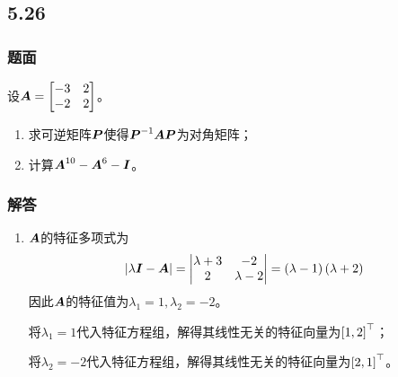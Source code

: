\documentclass{beamer}
\begin{document}
\subsection*{5.26}
\begin{frame}
    \frametitle{题面}
    设\(\boldsymbol{A}=\begin{bmatrix}-3&2\\-2&2\end{bmatrix}\)。
    \begin{enumerate}
        \item 求可逆矩阵\(\boldsymbol{P}\)使得\({\boldsymbol{P}}^{-1}\boldsymbol{A}\boldsymbol{P}\)为对角矩阵；
        \item 计算\(\boldsymbol{A}^{10}-\boldsymbol{A}^6-\boldsymbol{I}\)。
    \end{enumerate}
\end{frame}

\begin{frame}[allowframebreaks]
    \frametitle{解答}
    \begin{enumerate}
        \item {
              \(\boldsymbol{A}\)的特征多项式为
              \begin{equation*}
                  \left|\lambda\boldsymbol{I}-\boldsymbol{A} \right|=\begin{vmatrix}\lambda+3&-2\\2&\lambda-2\end{vmatrix}=\left( \lambda-1 \right)\left( \lambda+2 \right)
              \end{equation*}
              因此\(\boldsymbol{A}\)的特征值为\(\lambda_1=1,\lambda_2=-2\)。

              将\(\lambda_1=1\)代入特征方程组，解得其线性无关的特征向量为\(\left[ 1,2 \right]^\top\)；

              将\(\lambda_2=-2\)代入特征方程组，解得其线性无关的特征向量为\(\left[ 2,1 \right]^\top\)。

}
\end{enumerate}
\end{frame}
\end{document}
